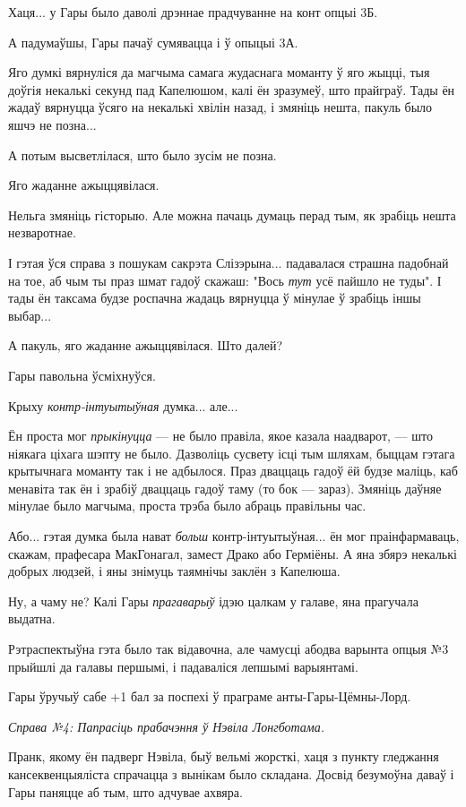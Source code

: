 Хаця... у Гары было даволі дрэннае прадчуванне на конт опцыі 3Б.

А падумаўшы, Гары пачаў сумявацца і ў опыцыі 3А.

Яго думкі вярнуліся да магчыма самага жудаснага моманту ў яго жыцці, тыя доўгія
некалькі секунд пад Капелюшом, калі ён зразумеў, што прайграў. Тады ён жадаў
вярнуцца ўсяго на некалькі хвілін назад, і змяніць нешта, пакуль было яшчэ не позна...

А потым высветлілася, што было зусім не позна. 

Яго жаданне ажыццявілася.

Нельга змяніць гісторыю. Але можна пачаць думаць перад тым, як зрабіць нешта незваротнае.

І гэтая ўся справа з пошукам сакрэта Слізэрына... падавалася страшна падобнай на тое,
аб чым ты праз шмат гадоў скажаш: "Вось \emph{тут} усё пайшло не туды". І тады
ён таксама будзе роспачна жадаць вярнуцца ў мінулае ў зрабіць іншы выбар...

А пакуль, яго жаданне ажыццявілася. Што далей?

Гары павольна ўсміхнуўся.

Крыху \emph{контр-інтуытыўная} думка... але... 

Ён проста мог \emph{прыкінуцца} --- не было правіла, якое казала наадварот, --- 
што ніякага ціхага шэпту не было. Дазволіць сусвету ісці тым шляхам, быццам 
гэтага крытычнага моманту так і не адбылося. Праз дваццаць гадоў ёй будзе маліць,
каб менавіта так ён і зрабіў дваццаць гадоў таму (то бок --- зараз). Змяніць даўняе 
мінулае было магчыма, проста трэба было абраць правільны час.

Або... гэтая думка была нават  \emph{больш} контр-інтуытыўная... ён мог праінфармаваць,
скажам, прафесара МакГонагал, замест Драко або Герміёны. А яна збярэ некалькі
добрых людзей, і яны знімуць таямнічы заклён з Капелюша.

Ну, а чаму не? Калі Гары \emph{прагаварыў} ідэю цалкам у галаве, яна прагучала
выдатна.

Рэтраспектыўна гэта было так відавочна, але чамусці абодва варынта опцыя №3
прыйшлі да галавы першымі, і падаваліся лепшымі варыянтамі. 

Гары ўручыў сабе +1 бал за поспехі ў праграме анты-Гары-Цёмны-Лорд.  

\emph{Справа №4: Папрасіць прабачэння ў Нэвіла Лонгботама.}

Пранк, якому ён падверг Нэвіла, быў вельмі жорсткі, 
хаця з пункту гледжання кансеквенцыяліста спрачацца з вынікам было складана.
Досвід безумоўна даваў і Гары паняцце аб тым, што адчувае ахвяра.

